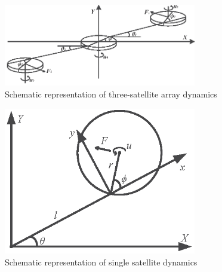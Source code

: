 \begin{figure}
\centering
\includegraphics[width=0.75\textwidth]{paper2_Fig2.eps}
\caption{Schematic representation of three-satellite array dynamics}
\label{Figure:model3body}
\end{figure}
\begin{figure}
\centering
\includegraphics[width=0.75\textwidth]{paper2_Fig3.eps}
\caption{Schematic representation of single satellite dynamics}
\label{Figure:modelsinglebody}
\end{figure}
